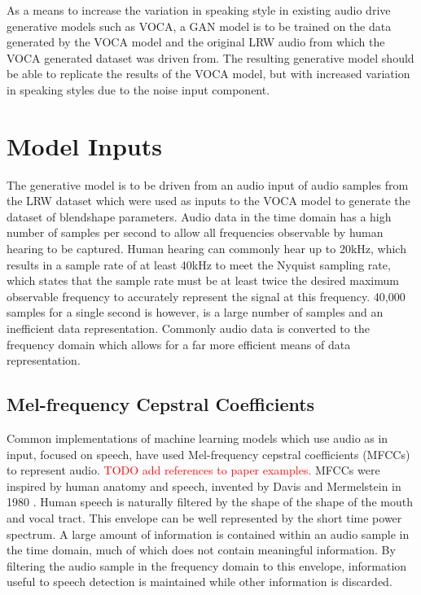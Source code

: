 As a means to increase the variation in speaking style in existing audio drive generative models such as VOCA, a GAN model is to be trained on the data generated by the VOCA model and the original LRW audio from which the VOCA generated dataset was driven from.
The resulting generative model should be able to replicate the results of the VOCA model, but with increased variation in speaking styles due to the noise input component.

\section{Model Inputs}
The generative model is to be driven from an audio input of audio samples from the LRW dataset which were used as inputs to the VOCA model to generate the dataset of blendshape parameters.
Audio data in the time domain has a high number of samples per second to allow all frequencies observable by human hearing to be captured.
Human hearing can commonly hear up to 20kHz, which results in a sample rate of at least 40kHz to meet the Nyquist sampling rate, which states that the sample rate must be at least twice the desired maximum observable frequency to accurately represent the signal at this frequency.
40,000 samples for a single second is however, is a large number of samples and an inefficient data representation.
Commonly audio data is converted to the frequency domain which allows for a far more efficient means of data representation. 

\subsection{Mel-frequency Cepstral Coefficients}
Common implementations of machine learning models which use audio as in input, focused on speech, have used Mel-frequency cepstral coefficients (MFCCs) to represent audio.
\textcolor{red}{TODO add references to paper examples.}
MFCCs were inspired by human anatomy and speech, invented by Davis and Mermelstein in 1980 \cite{Davis1980}.
Human speech is naturally filtered by the shape of the shape of the mouth and vocal tract.
This envelope can be well represented by the short time power spectrum.
A large amount of information is contained within an audio sample in the time domain, much of which does not contain meaningful information.
By filtering the audio sample in the frequency domain to this envelope, information useful to speech detection is maintained while other information is discarded.

